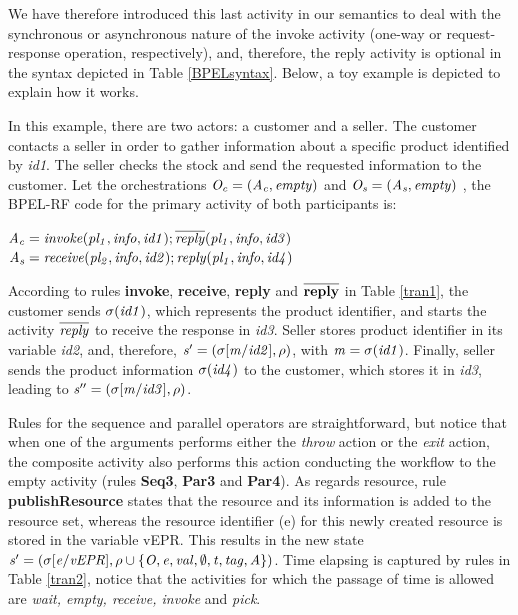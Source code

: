 We have therefore introduced this last activity
in our semantics to deal with the synchronous or asynchronous nature of
the invoke activity (one-way or request-response operation, respectively), and, therefore, the
reply activity is optional in the syntax depicted in Table \ref{BPELsyntax}. Below, a toy example 
is depicted to explain how it works.
\begin{example}\label{ex1} 
In this example, there are two actors: a customer and a
seller. The customer contacts a seller in order to gather information about a specific product identified by \emph{id1}. The seller checks the stock and send the requested information to the customer. Let the orchestrations ${\it O_{c}= (A_{c},empty)}$ and ${\it O_{s}= (A_{s},empty)}$ , the BPEL-RF code for the primary activity of both participants is:
\vspace{0.3cm}
\begin{flushleft}
\hspace{1cm}${\it A_{c}= invoke(pl_1,info,id1);\overline{reply}(pl_1,info,id3)}$\\
\hspace{1cm}${\it A_{s}= receive(pl_2,info,id2);reply(pl_1,info,id4)}$
\end{flushleft}
\end{example}

According to rules {\bf invoke}, {\bf receive}, {\bf reply} and {\bf $\overline{{\bf reply}}$} in Table \ref{tran1},  the customer sends ${\it \sigma(id1)}$, which represents the product identifier, and starts the activity ${\it \overline{reply}}$ to receive the response in {\it id3}. Seller stores product identifier in its variable {\it id2}, and, therefore, ${\it s'=(\sigma[m/id2],\rho)}$, with ${\it m=\sigma(id1)}$. Finally, seller sends the product information ${\it \sigma(id4)}$ to the customer, which stores it in {\it id3}, leading to ${\it s''=(\sigma[m/id3],\rho)}$.

Rules for the sequence and parallel operators are straightforward, but notice that when one of the
arguments performs either the \emph{throw} action or the \emph{exit} action, the composite
activity also performs this action conducting the workflow to the empty activity (rules {\bf Seq3}, {\bf Par3} and {\bf Par4}). As regards resource, rule {\bf publishResource} states that the resource and its information is added to the resource set, whereas the resource identifier (e) for this newly created resource is stored in the variable vEPR. This results in the new state $\it{s'=(\sigma[e/vEPR], \rho \cup \{O,e,val,\emptyset,t,tag,A\})}$. Time elapsing is captured by rules in Table \ref{tran2}, notice that the activities for which the passage of time is allowed are {\em wait, empty, receive, invoke} and {\em pick}.


